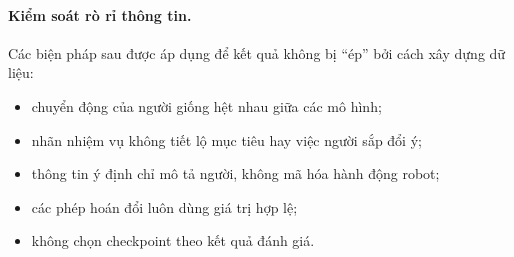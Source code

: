 \paragraph{Kiểm soát rò rỉ thông tin.} Các biện pháp sau được áp dụng để kết quả không bị ``ép'' bởi cách xây dựng dữ liệu:
\begin{itemize}
  \item chuyển động của người giống hệt nhau giữa các mô hình;
  \item nhãn nhiệm vụ không tiết lộ mục tiêu hay việc người sắp đổi ý;
  \item thông tin ý định chỉ mô tả người, không mã hóa hành động robot;
  \item các phép hoán đổi luôn dùng giá trị hợp lệ;
  \item không chọn checkpoint theo kết quả đánh giá.
\end{itemize}
